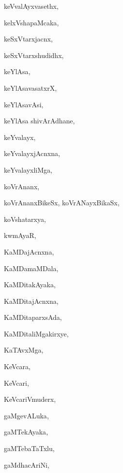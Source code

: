 \begin{multicols}{3}
{\noindent
{keVvalAyxvasethx}, \pageref{keVvalAyxvasethx}

\noindent
{kelxVshapaMcaka}, \pageref{kelxVshapaMcaka}

\noindent
{keSxVtarxjacnx}, \pageref{keSxVtarxjacnx}

\noindent
{keSxVtarxshudidhx}, \pageref{keSxVtarxshudidhx}

\noindent
{keYlAsa}, \pageref{keYlAsa}

\noindent
{keYlAsavasatxrX}, \pageref{keYlAsavasatxrX}

\noindent
{keYlAsavAsi}, \pageref{keYlAsavAsi}

\noindent
{keYlAsa shivArAdhane}, \pageref{keYlAsa shivArAdhane}

\noindent
{keYvalayx}, \pageref{keYvalayx}

\noindent
{keYvalayxjAcnxna}, \pageref{keYvalayxjAcnxna}

\noindent
{keYvalayxliMga}, \pageref{keYvalayxliMga}

\noindent
{koVrAnanx}, \pageref{koVrAnanx}

\noindent
{koVrAnanxBikeSx, koVrANayxBikaSx}, \pageref{koVrAnanxBikeSx, koVrANayxBikaSx}

\noindent
{koVshatarxya}, \pageref{koVshatarxya}

\noindent
{kwmAyaR}, \pageref{kwmAyaR}

\noindent
{KaMDajAcnxna}, \pageref{KaMDajAcnxna}

\noindent
{KaMDamaMDala}, \pageref{KaMDamaMDala}

\noindent
{KaMDitakAyaka}, \pageref{KaMDitakAyaka}

\noindent
{KaMDitajAcnxna}, \pageref{KaMDitajAcnxna}

\noindent
{KaMDitaparxsAda}, \pageref{KaMDitaparxsAda}

\noindent
{KaMDitaliMgakirxye}, \pageref{KaMDitaliMgakirxye}

\noindent
{KaTAvxMga}, \pageref{KaTAvxMga}

\noindent
{KeVcara}, \pageref{KeVcara}

\noindent
{KeVcari}, \pageref{KeVcari}

\noindent
{KeVcariVmuderx}, \pageref{KeVcariVmuderx}

\noindent
{gaMgevALuka}, \pageref{gaMgevALuka}

\noindent
{gaMTekAyaka}, \pageref{gaMTekAyaka}

\noindent
{gaMTebaTaTxlu}, \pageref{gaMTebaTaTxlu}

\noindent
{gaMdhacAriNi}, \pageref{gaMdhacAriNi}

}
\end{multicols}
